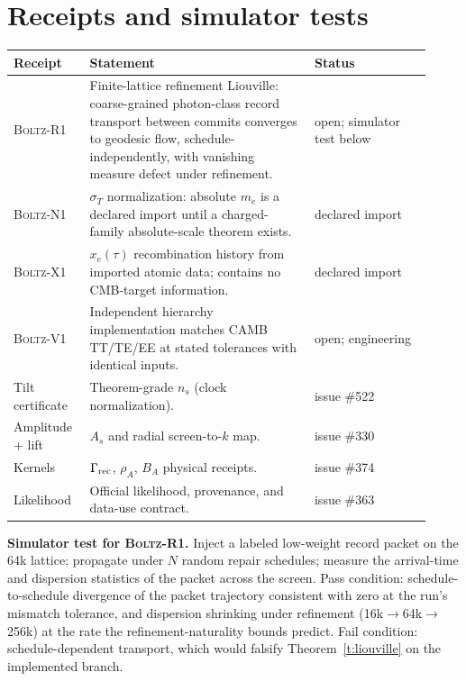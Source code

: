\documentclass[11pt]{article}
\theoremstyle{remark}
\begin{document}
\section{Receipts and simulator tests}\label{s:receipts}

\begin{longtable}{@{}p{0.16\linewidth}p{0.5\linewidth}p{0.26\linewidth}@{}}
\toprule
\textbf{Receipt} & \textbf{Statement} & \textbf{Status}\\
\midrule
\textsc{Boltz-R1} &
Finite-lattice refinement Liouville: coarse-grained photon-class record
transport between commits converges to geodesic flow, schedule-independently,
with vanishing measure defect under refinement. &
open; simulator test below\\
\textsc{Boltz-N1} &
$\sigma_T$ normalization: absolute $m_e$ is a declared import until a
charged-family absolute-scale theorem exists. &
declared import\\
\textsc{Boltz-X1} &
$x_e(\tau)$ recombination history from imported atomic data; contains no
CMB-target information. &
declared import\\
\textsc{Boltz-V1} &
Independent hierarchy implementation matches CAMB TT/TE/EE at stated
tolerances with identical inputs. &
open; engineering\\
Tilt certificate &
Theorem-grade $n_s$ (clock normalization). &
issue \#522\\
Amplitude + lift &
$A_s$ and radial screen-to-$k$ map. &
issue \#330\\
Kernels &
$\Gamma_{\rm rec}$, $\rho_A$, $B_A$ physical receipts. &
issue \#374\\
Likelihood &
Official likelihood, provenance, and data-use contract. &
issue \#363\\
\bottomrule
\end{longtable}

\textbf{Simulator test for \textsc{Boltz-R1}.} Inject a labeled low-weight
record packet on the 64k lattice; propagate under $N$ random repair
schedules; measure the arrival-time and dispersion statistics of the packet
across the screen. Pass condition: schedule-to-schedule divergence of the
packet trajectory consistent with zero at the run's mismatch tolerance, and
dispersion shrinking under refinement (16k$\to$64k$\to$256k) at the rate the
refinement-naturality bounds predict. Fail condition: schedule-dependent
transport, which would falsify Theorem~\ref{t:liouville} on the implemented
branch.
\end{document}
